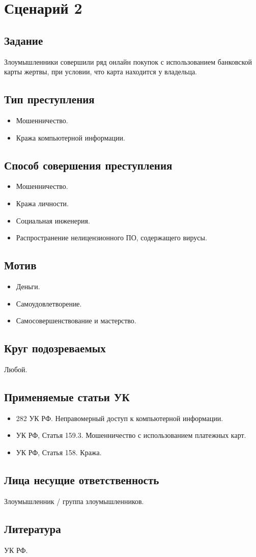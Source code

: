 \section*{Сценарий 2}

\subsection*{Задание}
Злоумышленники совершили ряд онлайн покупок с использованием банковской карты
жертвы, при условии, что карта находится у владельца.

\subsection*{Тип преступления}
\begin{itemize}
  \item Мошенничество.
  \item Кража компьютерной информации.
\end{itemize}

\subsection*{Способ совершения преступления}
\begin{itemize}
  \item Мошенничество.
  \item Кража личности.
  \item Социальная инженерия.
  \item Распространение нелицензионного ПО, содержащего вирусы.
\end{itemize}

\subsection*{Мотив}
\begin{itemize}
  \item Деньги.
  \item Самоудовлетворение.
  \item Самосовершенствование и мастерство.
\end{itemize}

\subsection*{Круг подозреваемых}
Любой.

\subsection*{Применяемые статьи УК}
\begin{itemize}
  \item 282 УК РФ. Неправомерный доступ к компьютерной информации.
  \item УК РФ, Статья 159.3. Мошенничество с использованием платежных карт.
  \item УК РФ, Статья 158. Кража.
\end{itemize}

\subsection*{Лица несущие ответственность}
Злоумышленник / группа злоумышленников.

\subsection*{Литература} УК РФ.
